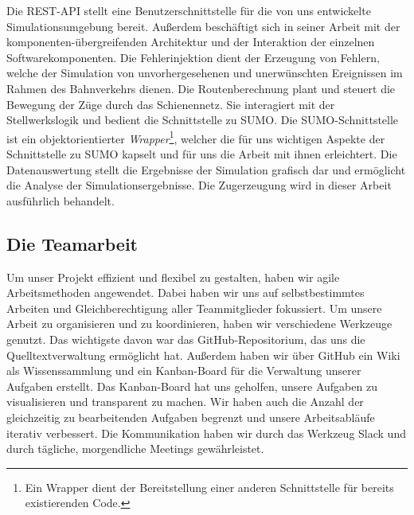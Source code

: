 Die REST-API stellt eine Benutzerschnittstelle für die von uns entwickelte Simulationsumgebung bereit. Außerdem beschäftigt sich \citeauthor{kamp_architektur_2023} in seiner Arbeit mit der komponenten-übergreifenden Architektur und der Interaktion der einzelnen Softwarekomponenten. Die Fehlerinjektion dient der Erzeugung von Fehlern, welche der Simulation von unvorhergesehenen und unerwünschten Ereignissen im Rahmen des Bahnverkehrs dienen. Die Routenberechnung plant und steuert die Bewegung der Züge durch das Schienennetz. Sie interagiert mit der Stellwerkslogik und bedient die Schnittstelle zu SUMO. Die SUMO-Schnittstelle ist ein objektorientierter \emph{Wrapper}\footnote{Ein Wrapper dient der Bereitstellung einer anderen Schnittstelle für bereits existierenden Code.}, welcher die für uns wichtigen Aspekte der Schnittstelle zu SUMO kapselt und für uns die Arbeit mit ihnen erleichtert. Die Datenauswertung stellt die Ergebnisse der Simulation grafisch dar und ermöglicht die Analyse der Simulationsergebnisse. Die Zugerzeugung wird in dieser Arbeit ausführlich behandelt.

\subsection{Die Teamarbeit}

Um unser Projekt effizient und flexibel zu gestalten, haben wir agile Arbeitsmethoden angewendet. Dabei haben wir uns auf selbstbestimmtes Arbeiten und Gleichberechtigung aller Teammitglieder fokussiert. Um unsere Arbeit zu organisieren und zu koordinieren, haben wir verschiedene Werkzeuge genutzt. Das wichtigste davon war das GitHub-Repositorium, das uns die Quelltextverwaltung ermöglicht hat. Außerdem haben wir über GitHub ein Wiki als Wissenssammlung und ein Kanban-Board für die Verwaltung unserer Aufgaben erstellt. Das Kanban-Board hat uns geholfen, unsere Aufgaben zu visualisieren und transparent zu machen. Wir haben auch die Anzahl der gleichzeitig zu bearbeitenden Aufgaben begrenzt und unsere Arbeitsabläufe iterativ verbessert. Die Kommunikation haben wir durch das Werkzeug Slack und durch tägliche, morgendliche Meetings gewährleistet.